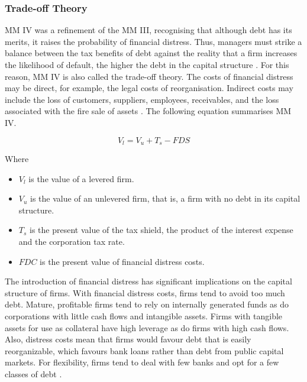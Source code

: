 \documentclass[a4paper, nobind]{templates/ociamthesis}
\providecommand{\tightlist}{%
  \setlength{\itemsep}{0pt}\setlength{\parskip}{0pt}}
\begin{document}
\hypertarget{trade-off-theory}{%
\subsubsection{Trade-off Theory}\label{trade-off-theory}}

\noindent MM IV was a refinement of the MM III, recognising that although debt has its merits, it raises the probability of financial distress. Thus, managers must strike a balance between the tax benefits of debt against the reality that a firm increases the likelihood of default, the higher the debt in the capital structure \autocite{de2011firms}. For this reason, MM IV is also called the trade-off theory. The costs of financial distress may be direct, for example, the legal costs of reorganisation. Indirect costs may include the loss of customers, suppliers, employees, receivables, and the loss associated with the fire sale of assets \autocite{ehrhardt2016corporate}. The following equation summarises MM IV.

\begin{equation}
V_{l} = V_{u} + T_{s} - FDS
\end{equation}

Where

\begin{itemize}
\tightlist
\item
  \(V_l\) is the value of a levered firm.
\item
  \(V_u\) is the value of an unlevered firm, that is, a firm with no debt in its capital structure.
\item
  \(T_s\) is the present value of the tax shield, the product of the interest expense and the corporation tax rate.
\item
  \(FDC\) is the present value of financial distress costs.
\end{itemize}

The introduction of financial distress has significant implications on the capital structure of firms. With financial distress costs, firms tend to avoid too much debt. Mature, profitable firms tend to rely on internally generated funds as do corporations with little cash flows and intangible assets. Firms with tangible assets for use as collateral have high leverage as do firms with high cash flows. Also, distress costs mean that firms would favour debt that is easily reorganizable, which favours bank loans rather than debt from public capital markets. For flexibility, firms tend to deal with few banks and opt for a few classes of debt \autocite{ehrhardt2016corporate}.
\end{document}
